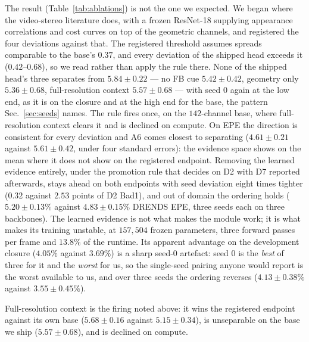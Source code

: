 \documentclass[letterpaper,10pt,conference]{ieeeconf}
\begin{document}
The result (Table~\ref{tab:ablations}) is not the one we expected. We began
where the video-stereo literature does, with a frozen ResNet-18
\cite{he2016resnet} supplying appearance correlations and cost curves on top of
the geometric channels, and registered the four deviations against that. The
registered threshold assumes spreads comparable to the base's $0.37$, and every
deviation of the shipped head exceeds it ($0.42$--$0.68$), so we read rather
than apply the rule there. None of the shipped head's three separates from
$5.84\pm0.22$ --- no FB cue $5.42\pm0.42$, geometry only $5.36\pm0.68$,
full-resolution context $5.57\pm0.68$ --- with seed $0$ again at the low end,
as it is on the closure and at the high end for the base, the pattern
Sec.~\ref{sec:seeds} names. The rule fires once, on the $142$-channel base,
where full-resolution context clears it and is declined on compute. On EPE the
direction is consistent for every deviation and A6 comes closest to separating
($4.61\pm0.21$ against $5.61\pm0.42$, under four standard errors): the
evidence space shows on the mean where it does not show on the registered
endpoint.
Removing the learned evidence entirely, under the promotion rule that decides on D2 with D7
reported afterwards, stays ahead on both endpoints with seed deviation eight
times tighter ($0.32$ against $2.53$ points of D2 Bad1), and out of domain the
ordering holds ($5.20\pm0.13\%$ against $4.83\pm0.15\%$ DRENDS EPE, three
seeds each on three backbones). The learned evidence is not what makes the
module work; it is what makes its training unstable, at $157{,}504$ frozen
parameters, three forward passes per frame and $13.8\%$ of the runtime. Its
apparent advantage on the development closure ($4.05\%$ against $3.69\%$) is a
sharp seed-$0$ artefact: seed $0$ is the \emph{best} of three for it and the
\emph{worst} for us, so the single-seed pairing anyone would report is the
worst available to us, and over three seeds the ordering reverses
($4.13\pm0.38\%$ against $3.55\pm0.45\%$).

Full-resolution context is the firing noted above: it wins the registered
endpoint against its own base ($5.68\pm0.16$ against $5.15\pm0.34$), is
unseparable on the base we ship ($5.57\pm0.68$), and is declined on compute.
\end{document}
